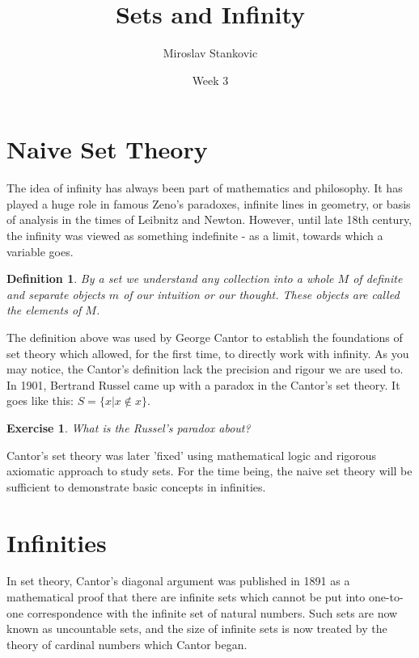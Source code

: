 \documentclass[11pt,a5paper]{article}
\title{\textbf{Sets and Infinity}}
\date{Week 3}
\author{Miroslav Stankovic}
\newtheorem{definition}{Definition}
\newtheorem{exercise}{Exercise}
\begin{document}
\maketitle




\section{Naive Set Theory}

The idea of infinity has always been part of mathematics and philosophy. It has played a huge role in famous Zeno's paradoxes, infinite lines in geometry, or basis of analysis in the times of Leibnitz and Newton. However, until late 18th century, the infinity was viewed as something indefinite - as a limit, towards which a variable goes.

\begin{definition}
By a \emph{set} we understand any collection into a whole $M$ of definite and separate objects $m$ of our intuition or our thought. These objects are called the \emph{elements} of $M$.
\end{definition}

\noindent The definition above was used by George Cantor to establish the foundations of set theory which allowed, for the first time, to directly work with infinity. As you may notice, the Cantor's definition lack the precision and rigour we are used to. In 1901, Bertrand Russel came up with a paradox in the Cantor's set theory. It goes like this: $S=\{x|x\notin x\}$.

\begin{exercise} What is the Russel's paradox about?
\end{exercise}

\noindent Cantor's set theory was later 'fixed' using mathematical logic and rigorous axiomatic approach to study sets. For the time being, the naive set theory will be sufficient to demonstrate basic concepts in infinities.

\section{Infinities}

\noindent In set theory, Cantor's diagonal argument was published in 1891 as a mathematical proof that there are infinite sets which cannot be put into one-to-one correspondence with the infinite set of natural numbers. Such sets are now known as uncountable sets, and the size of infinite sets is now treated by the theory of cardinal numbers which Cantor began. 
\end{document}

